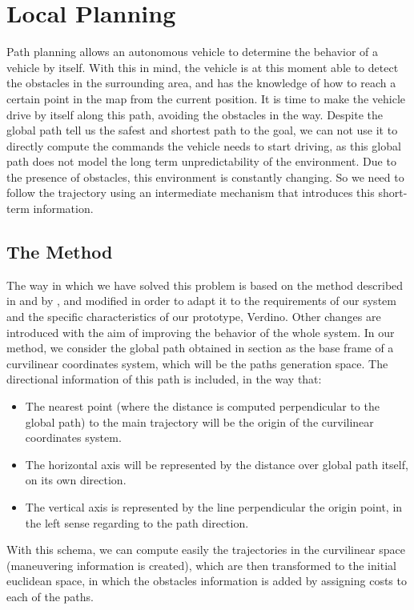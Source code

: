 
\graphicspath{{./images/chapter07/bmps/}{./images/chapter07/vects/}{./images/chapter07/}}

\chapter{Local Planning}\label{ch:chapter07}

Path planning allows an autonomous vehicle to determine the behavior of a vehicle by itself. With this in mind, the vehicle is at this moment able to detect the obstacles in the surrounding area, and has the knowledge of how to reach a certain point in the map from the current position. It is time to make the vehicle drive by itself along this path, avoiding the obstacles in the way.
Despite the global path tell us the safest and shortest path to the goal, we can not use it to directly compute the commands the vehicle needs to start driving, as this global path does not model the long term unpredictability of the environment. Due to the presence of obstacles, this environment is constantly changing. So we need to follow the trajectory using an intermediate mechanism that introduces this short-term information.

\section{The Method}\label{ch:chapter07_01}

The way in which we have solved this problem is based on the method described in \cite{chu2012local} and by \cite{thrun2006stanley}, and modified in order to adapt it to the requirements of our system and the specific characteristics of our prototype, Verdino. Other changes are introduced with the aim of improving the behavior of the whole system.
In our method, we consider the global path obtained in section  as the base frame of a curvilinear coordinates system, which will be the paths generation space. The directional information of this path is included, in the way that:
\begin{itemize}
 \item The nearest point (where the distance is computed perpendicular to the global path) to the main trajectory will be the origin of the curvilinear coordinates system.
 \item The horizontal axis will be represented by the distance over global path itself, on its own direction.
 \item The vertical axis is represented by the line perpendicular the origin point, in the left sense regarding to the path direction.
\end{itemize}
With this schema, we can compute easily the trajectories in the curvilinear space (maneuvering information is created), which are then transformed to the initial euclidean space, in which the obstacles information is added by assigning costs to each of the paths.

